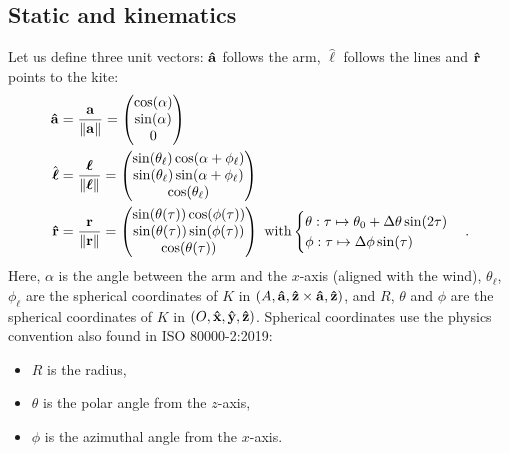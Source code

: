 \subsection{Static and kinematics}
Let us define three unit vectors: $\vu a$ follows the arm, $\hat{\boldsymbol{\ell}}$ follows the lines and $\vu r$ points to the kite:
\begin{align}
    \vu a &= \frac{\vb a}{\norm{\vb a}} = \begin{pmatrix}
        \cos(\alpha) \\ \sin(\alpha) \\ 0
    \end{pmatrix} \\
    \hat{\boldsymbol{\ell}} &= \frac{\boldsymbol{\ell}}{\norm{\boldsymbol{\ell}}} = \begin{pmatrix}
        \sin(\theta_\ell) \cos(\alpha + \phi_\ell) \\ \sin(\theta_\ell) \sin(\alpha + \phi_\ell) \\ \cos(\theta_\ell)
    \end{pmatrix} \\ \label{eq:that-10D}
    \vu r &= \frac{\vb r}{\norm{\vb r}} = \begin{pmatrix}
        \sin(\theta(\tau)) \cos(\phi(\tau)) \\ \sin(\theta(\tau)) \sin(\phi(\tau)) \\ \cos(\theta(\tau))
    \end{pmatrix} \text{ with}
    \begin{cases}
        \theta : \tau \mapsto \theta_0 + \Delta \theta \sin(2\tau) \\
        \phi : \tau \mapsto \Delta \phi \sin(\tau)
    \end{cases}.
\end{align}
%
Here, $\alpha$ is the angle between the arm and the $x$-axis (aligned with the wind), $\theta_\ell$, $\phi_\ell$ are the spherical coordinates of $K$ in $(A, \vu a, \vu z \times \vu a, \vu z)$, and $R$, $\theta$ and $\phi$ are the spherical coordinates of $K$ in $(O, \vu x, \vu y, \vu z)$.
Spherical coordinates use the physics convention also found in ISO 80000-2:2019:
\begin{itemize}
    \item $R$ is the radius,
    \item $\theta$ is the polar angle from the $z$-axis,
    \item $\phi$ is the azimuthal angle from the $x$-axis.
\end{itemize}
%
